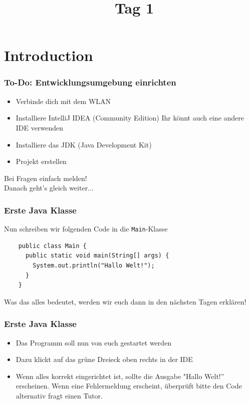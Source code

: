 \documentclass{../../presentation}
\title{\vkTitle\ Tag 1}
\author{\vkAuthors}
\institute{\vkInstitute}
\date{\vkDateDayOne}
\begin{document}
\begin{frame}
	\titlepage
\end{frame}

\section{Introduction}

\begin{frame}
	\frametitle{To-Do: Entwicklungsumgebung einrichten}

	\begin{itemize}
		\item Verbinde dich mit dem WLAN
		\item Installiere IntelliJ IDEA (Community Edition) \newline
		      \achtung{} Ihr könnt auch eine andere IDE verwenden
		\item Installiere das JDK (Java Development Kit)
		\item Projekt erstellen
	\end{itemize}
	\vfill
	\centering
	\Large
	Bei Fragen einfach melden! \\
	\vspace{0.5em}
	Danach geht's gleich weiter...
\end{frame}

\begin{frame}[fragile]
	\frametitle{Erste Java Klasse}
	Nun schreiben wir folgenden Code in die \texttt{Main}-Klasse
	\begin{verbatim}
    public class Main {
      public static void main(String[] args) {
        System.out.println("Hallo Welt!");
      }
    }
  \end{verbatim}
	\achtung{} Was das alles bedeutet, werden wir euch dann in den nächsten Tagen erklären!
\end{frame}

\begin{frame}
	\frametitle{Erste Java Klasse}
	\begin{itemize}
		\item Das Programm soll nun von euch gestartet werden
		\item Dazu klickt auf das grüne Dreieck oben rechts in der IDE
		\item Wenn alles korrekt eingerichtet ist, sollte die Ausgabe "Hallo Welt!'' erscheinen.
		      \achtung{} Wenn eine Fehlermeldung erscheint, überprüft bitte den Code alternativ fragt einen Tutor.
	\end{itemize}
\end{frame}
\end{document}
